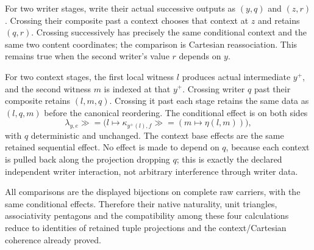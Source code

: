 \documentclass[11pt]{article}
\begin{document}
For two writer stages, write their actual successive outputs as $(y,q)$ and $(z,r)$. Crossing their composite past a context chooses that context at $z$ and retains $(q,r)$. Crossing successively has precisely the same conditional context and the same two content coordinates; the comparison is Cartesian reassociation. This remains true when the second writer's value $r$ depends on $y$.

For two context stages, the first local witness $l$ produces actual intermediate $y^+$, and the second witness $m$ is indexed at that $y^+$. Crossing writer $q$ past their composite retains $(l,m,q)$. Crossing it past each stage retains the same data as $(l,q,m)$ before the canonical reordering. The conditional effect is on both sides
\[
 \lambda_{y,e}\mathbin{\gg=}\bigl(l\mapsto
 \kappa_{y^+(l),f}\mathbin{\gg=}(m\mapsto\eta(l,m))\bigr),
\]
with $q$ deterministic and unchanged. The context base effects are the same retained sequential effect. No effect is made to depend on $q$, because each context is pulled back along the projection dropping $q$; this is exactly the declared independent writer interaction, not arbitrary interference through writer data.

All comparisons are the displayed bijections on complete raw carriers, with the same conditional effects. Therefore their native naturality, unit triangles, associativity pentagons and the compatibility among these four calculations reduce to identities of retained tuple projections and the context/Cartesian coherence already proved.
\end{document}
